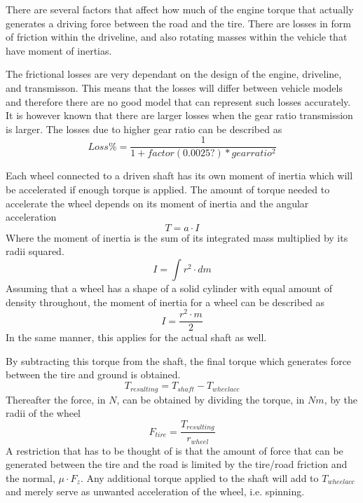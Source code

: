There are several factors that affect how much of the engine torque that actually generates a driving force between the road and the tire. There are losses in form of friction within the driveline, and also rotating masses within the vehicle that have moment of inertias. 

The frictional losses are very dependant on the design of the engine, driveline, and transmisson. This means that the losses will differ between vehicle models and therefore there are no good model that can represent such losses accurately. It is however known that there are larger losses when the gear ratio transmission is larger. The losses due to higher gear ratio can be described as
\begin{equation}
	Loss\% = \frac{1}{1 + factor(0.0025?)*gearratio^2}
\end{equation}

Each wheel connected to a driven shaft has its own moment of inertia which will be accelerated if enough torque is applied. The amount of torque needed to accelerate the wheel depends on its moment of inertia and the angular acceleration
\begin{equation}
	T = a \cdot I
\end{equation}
Where the moment of inertia is the sum of its integrated mass multiplied by its radii squared. 
\begin{equation}
	I = \int r^2 \cdot dm
\end{equation}
Assuming that a wheel has a shape of a solid cylinder with equal amount of density throughout, the moment of inertia for a wheel can be described as
\begin{equation}
	I = \dfrac{r^2 \cdot m}{2} 
\end{equation}
In the same manner, this applies for the actual shaft as well. 

By subtracting this torque from the shaft, the final torque which generates force between the tire and ground is obtained.
\begin{equation}
	T_{resulting} = T_{shaft} - T_{wheel acc}
\end{equation}
Thereafter the force, in $ N $, can be obtained by dividing the torque, in $ Nm $, by the radii of the wheel
\begin{equation}
	F_{tire} = \frac{T_{resulting}}{r_{wheel}}
\end{equation}
A restriction that has to be thought of is that the amount of force that can be generated between the tire and the road is limited by the tire/road friction and the normal, $ \mu \cdot F_{z} $. Any additional torque applied to the shaft will add to $ T_{wheelacc} $ and merely serve as unwanted acceleration of the wheel, i.e. spinning.



